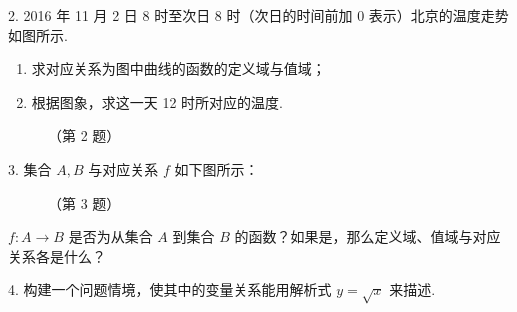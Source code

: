 \documentclass[a4paper,11pt]{ctexart}
\begin{document}
	
	
	2. 2016 年 11 月 2 日 8 时至次日 8 时（次日的时间前加 0 表示）北京的温度走势如图所示.
	\begin{enumerate}[label=(\arabic*)]
		\item 求对应关系为图中曲线的函数的定义域与值域；
		\item 根据图象，求这一天 12 时所对应的温度.
	\end{enumerate}
	
	\begin{figure}[htbp]
		\centering
		\caption{（第 2 题）}
	\end{figure}
	
	3. 集合 \(A, B\) 与对应关系 \(f\) 如下图所示：
	\begin{figure}[htbp]
		\centering
		\caption{（第 3 题）}
	\end{figure}
	
	\(f: A \to B\) 是否为从集合 \(A\) 到集合 \(B\) 的函数？如果是，那么定义域、值域与对应关系各是什么？
	
	4. 构建一个问题情境，使其中的变量关系能用解析式 \(y = \sqrt{x}\) 来描述.
	
\end{document}
